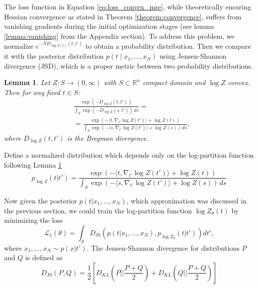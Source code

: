 \documentclass{article}
\theoremstyle{plain}
\newtheorem{lemma}[theorem]{Lemma}
\theoremstyle{definition}
\theoremstyle{remark}
\begin{document}
The loss function in Equation \ref{eq:loss_convex_mse}, while theoretically ensuring Hessian convergence as stated in Theorem \ref{theorem:convergence}, suffers from vanishing gradients during the initial optimization stages (see  lemma \ref{lemma:vanishing} from the Appendix section). To address this problem, we normalize \( e^{-N D_{\log Z(t)}(t,t')} \) to obtain a probability distribution. Then we compare it with the posterior distribution \( p(t \mid x_1, \ldots, x_N) \) using Jensen-Shannon divergence (JSD), which is a proper metric between two probability distributions.


\begin{lemma}
Let $ Z: S \to (0,\infty) $ with $ S \subset \mathbb{R}^n $ compact domain and $ \log Z $ convex. Then for any fixed $ t \in S $:
\begin{equation}
\begin{split}
    &\frac{\exp\left(-D_{\log Z}(t, t')\right)}{\int_{S} \exp\left(-D_{\log Z}( s, t')\right) \, ds} = \\&= \frac{\exp\left(-\langle t, \nabla_{t'} \log Z(t') \rangle + \log Z(t)\right)}{\int_{S} \exp\left(-\langle s, \nabla_{t'} \log Z(t') \rangle + \log Z(s)\right) \, ds},
\end{split}
\end{equation}
where $D_{\log Z}(t, t')$ is the Bregman divergence.
\label{lemma:tamm_loss}
\end{lemma}



Define a normalized distribution which depends only on the log-partition function following Lemma \ref{lemma:tamm_loss}
\begin{equation}
    p_{\log Z}(t|t') = \frac{\exp\left(-\langle t, \nabla_{t'} \log Z(t') \rangle + \log Z(t)\right)}{\int_{S} \exp\left(-\langle s, \nabla_{t'} \log Z(t') \rangle + \log Z(s)\right) \, ds}
\end{equation}

Now given the posterior $p(t|x_1, \ldots, x_N)$, which approximation was discussed in the previous section, we could train the log-partition function $\log Z_{\theta}(t)$ by minimizing the loss
\begin{equation}
    \mathcal{L}_1(\theta) = \int_{\mathcal{S} }D_{\text{JS}}\left(p(t|x_1, \ldots, x_N), p_{\log Z_{\theta}}(t|t')\right) dt',
\end{equation}
where $x_1, \ldots, x_N \sim p(x|t')$. The Jensen-Shannon divergence for distributions $P$ and $Q$ is defined as
\begin{equation}
    D_{\text{JS}}(P, Q) = \frac{1}{2} \left[ D_{KL}(P|| \frac{P+Q}{2}) + D_{KL}(Q||  \frac{P+Q}{2} )\right]
\end{equation}
\end{document}
